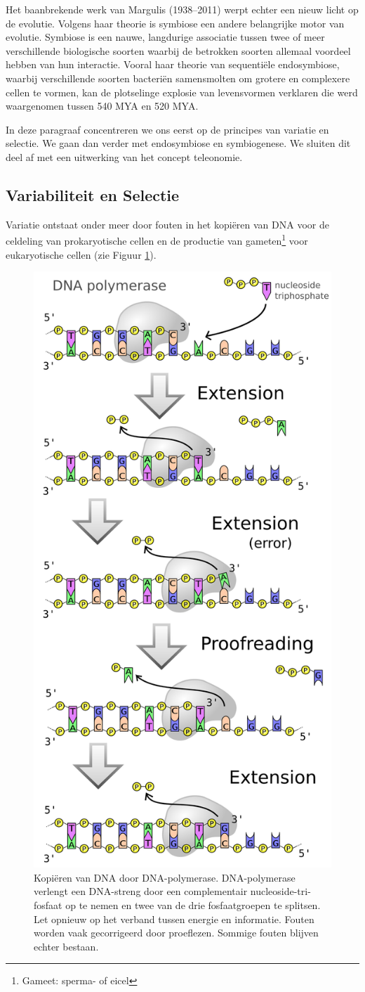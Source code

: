 \documentclass[
  11pt,
]{book}
\begin{document}
Het baanbrekende werk van Margulis (1938--2011) werpt echter een nieuw licht op de evolutie. Volgens haar theorie is symbiose een andere belangrijke motor van evolutie. Symbiose is een nauwe, langdurige associatie tussen twee of meer verschillende biologische soorten waarbij de betrokken soorten allemaal voordeel hebben van hun interactie. Vooral haar theorie van sequentiële endosymbiose, waarbij verschillende soorten bacteriën samensmolten om grotere en complexere cellen te vormen, kan de plotselinge explosie van levensvormen verklaren die werd waargenomen tussen 540 MYA en 520 MYA.

In deze paragraaf concentreren we ons eerst op de principes van variatie en selectie. We gaan dan verder met endosymbiose en symbiogenese. We sluiten dit deel af met een uitwerking van het concept teleonomie.

\hypertarget{variabiliteit-en-selectie}{%
\subsection{Variabiliteit en Selectie}\label{variabiliteit-en-selectie}}

Variatie ontstaat onder meer door fouten in het kopiëren van DNA voor de celdeling van prokaryotische cellen en de productie van gameten\footnote{Gameet: sperma- of eicel} voor eukaryotische cellen (zie Figuur \ref{fig:dnaPolymerase}).

\begin{figure}

{\centering \includegraphics[width=0.45\linewidth]{./figs/DNA_polymerase} 

}

\caption{Kopiëren van DNA door DNA-polymerase. DNA-polymerase verlengt een DNA-streng door een complementair nucleoside-tri-fosfaat op te nemen en twee van de drie fosfaatgroepen te splitsen. Let opnieuw op het verband tussen energie en informatie. Fouten worden vaak gecorrigeerd door proeflezen. Sommige fouten blijven echter bestaan.}\label{fig:dnaPolymerase}
\end{figure}
\end{document}
